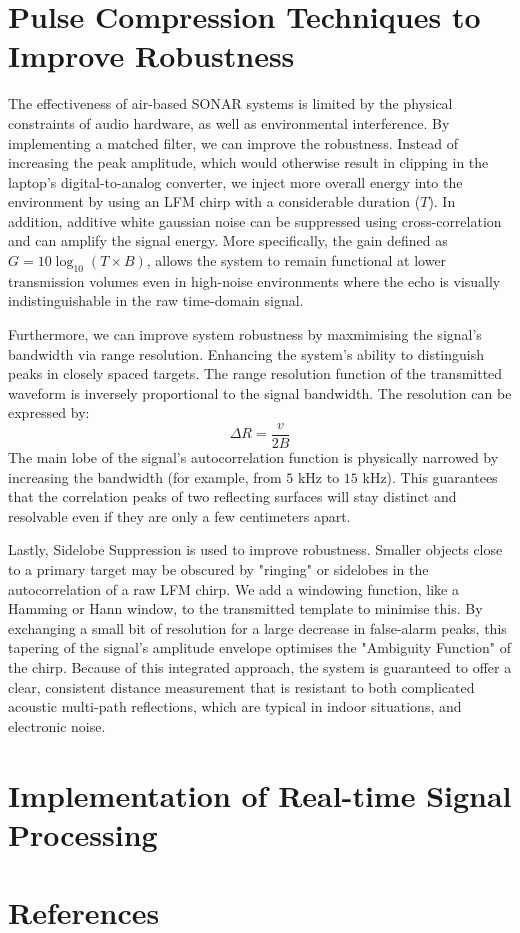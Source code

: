 \documentclass[11pt, a4paper]{article}
\begin{document}
\section{Pulse Compression Techniques to Improve Robustness}

The effectiveness of air-based SONAR systems is limited by the physical constraints of audio hardware, as well as environmental interference. By implementing a matched filter, we can improve the robustness. Instead of increasing the peak amplitude, which would otherwise result in clipping in the laptop's digital-to-analog converter, we inject more overall energy into the environment by using an LFM chirp with a considerable duration ($T$). In addition, additive white gaussian noise can be suppressed using cross-correlation and can amplify the signal energy. More specifically, the gain defined as $G = 10 \log_{10}(T \times B)$, allows the system to remain functional at lower transmission volumes even in high-noise environments where the echo is visually indistinguishable in the raw time-domain signal.

\vspace{1\baselineskip}

\noindent Furthermore, we can improve system robustness by maxmimising the signal's bandwidth via range resolution. Enhancing the system's ability to distinguish peaks in closely spaced targets. The range resolution function of the transmitted waveform is inversely proportional to the signal bandwidth. The resolution can be expressed by:
\[
\Delta R = \frac{v}{2B}
\]
The main lobe of the signal's autocorrelation function is physically narrowed by increasing the bandwidth (for example, from $5$ kHz to $15$ kHz). This guarantees that the correlation peaks of two reflecting surfaces will stay distinct and resolvable even if they are only a few centimeters apart.

\vspace{1\baselineskip}

\noindent Lastly, Sidelobe Suppression is used to improve robustness. Smaller objects close to a primary target may be obscured by "ringing" or sidelobes in the autocorrelation of a raw LFM chirp. We add a windowing function, like a Hamming or Hann window, to the transmitted template to minimise this. By exchanging a small bit of resolution for a large decrease in false-alarm peaks, this tapering of the signal's amplitude envelope optimises the "Ambiguity Function" of the chirp. Because of this integrated approach, the system is guaranteed to offer a clear, consistent distance measurement that is resistant to both complicated acoustic multi-path reflections, which are typical in indoor situations, and electronic noise.

\section{Implementation of Real-time Signal Processing}

\section{References}
\end{document}

